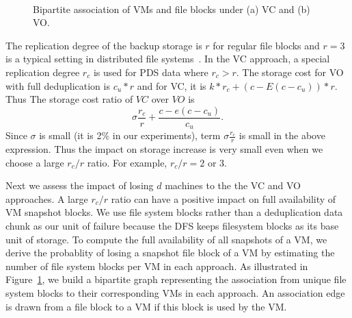 \begin{figure}
    \centering
    \\
    \caption{Bipartite association of VMs and file blocks under (a) VC and (b) VO. }
    \label{fig:share}
\end{figure}

The replication degree of the backup storage 
is $r$ for regular file blocks and $r=3$ is a typical setting in distributed
file systems~\cite{googlefs03,hdfs10}.
In the VC approach, a special replication degree $r_c$ is used for PDS data where $r_c>r$. 
The storage cost for VO with full deduplication is $c_u *r$ and for VC, it is
$ k*r_c  + (c-E(c-c_u))*r$. Thus The storage cost ratio of $VC$ over $VO$ is 
\[
\sigma \frac{r_c}{r} + \frac{c-e(c-c_u)}{c_u}.
\]
Since $\sigma$ is small (it is 2\% in our experiments),  
term $\sigma \frac{r_c}{r}$ is small in the above expression.  
Thus the impact on storage increase is very small even when we choose a large $r_c/r$ ratio. 
For example, $r_c/r=2$ or 3. 

Next we  assess  the impact of losing $d$ machines 
to the the VC and VO approaches.  
A large $r_c/r$ ratio can have a positive impact on full availability of VM snapshot blocks.
We use file system blocks rather than a deduplication
data chunk as our unit of failure because the DFS keeps
filesystem blocks as its base unit of storage.
To compute the full availability of all snapshots of a VM, we derive
the probablity of losing a snapshot file block of a VM by
estimating the number of file system blocks per VM in each approach.
As illustrated in Figure~\ref{fig:share},
we build a bipartite graph representing the association from unique file system blocks
to their corresponding VMs in each approach. An association edge is  drawn  from a file block  to a VM 
if this block is used by the VM. 

